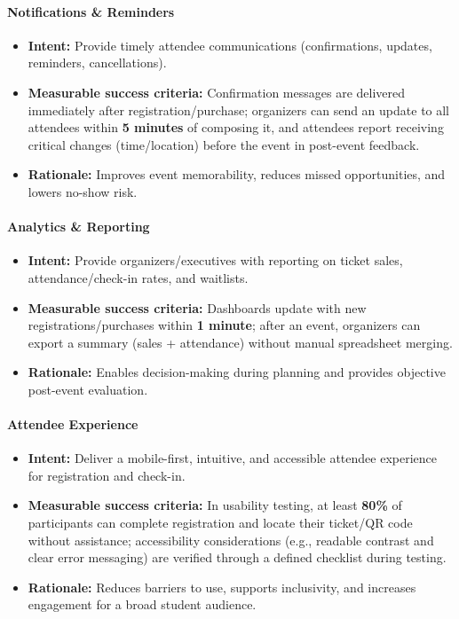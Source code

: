 \documentclass{article}
\begin{document}
\paragraph{Notifications \& Reminders}
\begin{itemize}
    \item \textbf{Intent:} Provide timely attendee communications (confirmations, updates, reminders, cancellations).
    \item \textbf{Measurable success criteria:} Confirmation messages are delivered immediately after registration/purchase; organizers can send an update to all attendees within \textbf{5 minutes} of composing it, and attendees report receiving critical changes (time/location) before the event in post-event feedback.
    \item \textbf{Rationale:} Improves event memorability, reduces missed opportunities, and lowers no-show risk.
\end{itemize}

\paragraph{Analytics \& Reporting}
\begin{itemize}
    \item \textbf{Intent:} Provide organizers/executives with reporting on ticket sales, attendance/check-in rates, and waitlists.
    \item \textbf{Measurable success criteria:} Dashboards update with new registrations/purchases within \textbf{1 minute}; after an event, organizers can export a summary (sales + attendance) without manual spreadsheet merging.
    \item \textbf{Rationale:} Enables decision-making during planning and provides objective post-event evaluation.
\end{itemize}

\paragraph{Attendee Experience}
\begin{itemize}
    \item \textbf{Intent:} Deliver a mobile-first, intuitive, and accessible attendee experience for registration and check-in.
    \item \textbf{Measurable success criteria:} In usability testing, at least \textbf{80\%} of participants can complete registration and locate their ticket/QR code without assistance; accessibility considerations (e.g., readable contrast and clear error messaging) are verified through a defined checklist during testing.
    \item \textbf{Rationale:} Reduces barriers to use, supports inclusivity, and increases engagement for a broad student audience.
\end{itemize}
\end{document}
